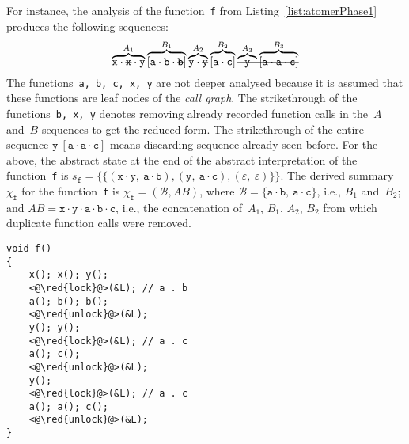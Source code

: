 \begin{example}
    For instance, the analysis of the function~\texttt{f} from Listing~\ref{list:atomerPhase1} produces the following sequences:
    $$
        \overbrace{\mathtt{x} \cdot \text{\texttt{\sout{x}}} \cdot \mathtt{y}}^{A_1} \overbrace{[\mathtt{a} \cdot \mathtt{b} \cdot \text{\texttt{\sout{b}}}]}^{B_1}
        \overbrace{\mathtt{y} \cdot \text{\texttt{\sout{y}}}}^{A_2} \overbrace{[\mathtt{a} \cdot \mathtt{c}]}^{B_2}
        \text{\sout{\ensuremath{\overbrace{\mathtt{y}}^{A_3} \overbrace{[\mathtt{a} \cdot \mathtt{a} \cdot \mathtt{c}]}^{B_3}}}}
    $$
    The functions~\texttt{a, b, c, x, y} are not deeper analysed because it is assumed that these functions are leaf nodes of the \emph{call graph}. The strikethrough of the functions~\texttt{b, x, y} denotes removing already recorded function calls in the~$ A $ and~$ B $ sequences to get the reduced form. The strikethrough of the entire sequence $ \mathtt{y}\ [\mathtt{a} \cdot \mathtt{a} \cdot \mathtt{c}] $ means discarding sequence already seen before. For the above, the abstract state at the end of the abstract interpretation of the function~\texttt{f} is $ s_\mathtt{f} = \{\{(\mathtt{x} \cdot \mathtt{y},\ \mathtt{a} \cdot \mathtt{b}), (\mathtt{y},\ \mathtt{a} \cdot \mathtt{c}), (\varepsilon,\ \varepsilon)\}\} $. The derived summary~$ \chi_\mathtt{f} $ for the function~\texttt{f} is $ \chi_\mathtt{f} = (\mathcal{B}, AB) $, where $ \mathcal{B} = \{\mathtt{a} \cdot \mathtt{b},\ \mathtt{a} \cdot \mathtt{c}\} $, i.e., $ B_1 $ and~$ B_2 $; and $ AB = \mathtt{x} \cdot \mathtt{y} \cdot \mathtt{a} \cdot \mathtt{b} \cdot \mathtt{c} $, i.e., the concatenation of~$ A_1 $, $ B_1 $, $ A_2 $, $ B_2 $ from which duplicate function calls were removed.
\end{example}

\begin{lstlisting}[style=c, label={list:atomerPhase1}, float=hbt, caption={A~code snippet used for an illustration of the derivation of \emph{sequences of functions called atomically}}]
void f()
{
    x(); x(); y();
    <@\red{lock}@>(&L); // a . b
    a(); b(); b();
    <@\red{unlock}@>(&L);
    y(); y();
    <@\red{lock}@>(&L); // a . c
    a(); c();
    <@\red{unlock}@>(&L);
    y();
    <@\red{lock}@>(&L); // a . c
    a(); a(); c();
    <@\red{unlock}@>(&L);
}
\end{lstlisting}

